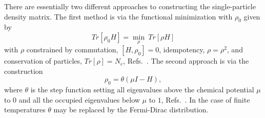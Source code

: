 \commentoutA{\documentclass[superbib,aps,prb,epsfig,floats,twocolumn]{revtex4}}
\begin{document}
There are essentially two different approaches to constructing 
the single-particle density matrix. The first method is via 
the functional minimization with $\rho_0$ given by
\begin{equation}
\label{FMin}
Tr[ \rho_0 H ]  = \min_{\rho} ~ Tr[ \rho H ]
\end{equation}
with $\rho$ constrained by commutation, $[H,\rho_0] =0$, idempotency,
$\rho = \rho^2$, and conservation of particles, $Tr [\rho ] = N_e$,
Refs.\ \cite{Sameh82,Li93,Carlsson95,Hernandez96,Kohn96,Daniels97,Yang97,Stephan98,Challacombe99,Haynes99,Bowler99,Daniels99}.
The second approach is via the construction
\begin{equation}
\label{Heavyside}
\rho_0 = \theta ( \mu I - H ),
\end{equation}
where $\theta$ is the step function setting all eigenvalues
above the chemical potential $\mu$ to $0$ and all the occupied eigenvalues
below $\mu$ to $1$, 
Refs.\ \cite{Bowler99,Daniels99,McWeeny60,Goedecker94,Palser98,Beylkin99,Holas01,Niklasson02,Kenney95}.
In the case of finite temperatures $\theta$ may be replaced by the Fermi-Dirac distribution.
\end{document}

